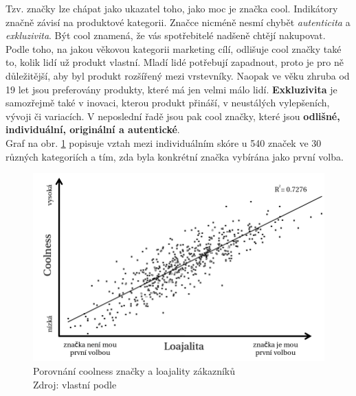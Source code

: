 Tzv.  značky lze chápat jako ukazatel toho, jako moc je značka cool. Indikátory značně závisí na produktové kategorii. Značce nicméně nesmí chybět \textit{autenticita} a \textit{exkluzivita}. Být cool znamená, že vás spotřebitelé nadšeně chtějí nakupovat.
Podle toho, na jakou věkovou kategorii marketing cílí, odlišuje cool značky také to, kolik lidí už produkt vlastní. Mladí lidé potřebují zapadnout, proto je pro ně důležitější, aby byl produkt rozšířený mezi vrstevníky. Naopak ve věku zhruba od 19 let jsou preferovány produkty, které má jen velmi málo lidí.\cite{bergh2012coolznacky}
\textbf{Exkluzivita} je samozřejmě také v inovaci, kterou produkt přináší, v neustálých vylepšeních, vývoji či variacích. V neposlední řadě jsou pak cool značky, které jsou \textbf{odlišné, individuální, originální a autentické}.\\
Graf na obr. \ref{fig:coolness-vs-loyalty} popisuje vztah mezi individuálním skóre  u 540 značek ve 30 různých kategoriích a tím, zda byla konkrétní značka vybírána jako první volba.

\bigskip
\begin{figure}[htbp!]
    \centering
    \includegraphics[width=.95\textwidth]{assets/coolness-vs-loyalty.png}
    \caption[Porovnání coolness značky a loajality zákazníků]{Porovnání coolness značky a loajality zákazníků \\ Zdroj: vlastní podle \textcite[s. 95]{bergh2012coolznacky}}
    \label{fig:coolness-vs-loyalty}
\end{figure}